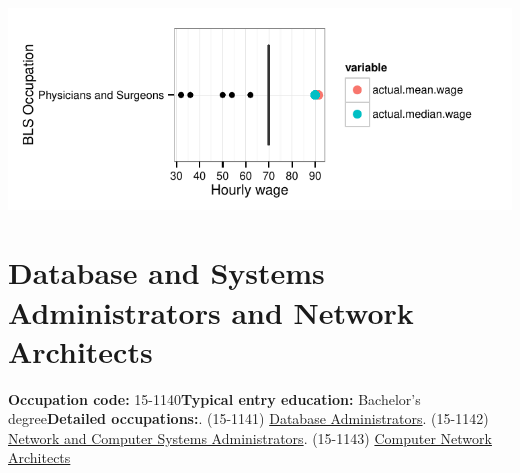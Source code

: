 \documentclass[a4paper,10pt]{article}\usepackage[]{graphicx}\usepackage[]{color}
\makeatletter
\def\maxwidth{ %
  \ifdim\Gin@nat@width>\linewidth
    \linewidth
  \else
    \Gin@nat@width
  \fi
}
\makeatother
\begin{document}
{\centering \includegraphics[width=\maxwidth]{figure/unnamed-chunk-249} 

}


\newpage\section{Database and Systems Administrators and Network Architects}\textbf{Occupation code:} 15-1140\newline\textbf{Typical entry education:} Bachelor's degree\newline\textbf{Detailed occupations:}. (15-1141)  \href{http://www.bls.gov/oes/current/oes151141.htm}{Database Administrators}. (15-1142)  \href{http://www.bls.gov/oes/current/oes151142.htm}{Network and Computer Systems Administrators}. (15-1143)  \href{http://www.bls.gov/oes/current/oes151143.htm}{Computer Network Architects}\newline%
\end{document}
